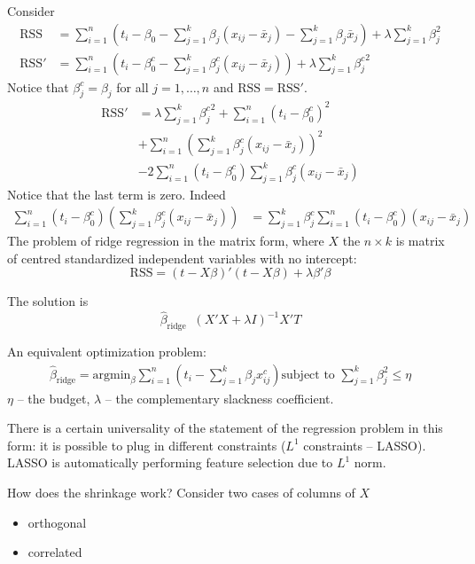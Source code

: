 \documentclass[a4paper]{article}
\newcommand{\brac}[1]{{\left ( #1 \right )}}
\newcommand{\RSS}{\text{RSS}}
\newcommand{\defn}{\mathop{\overset{\Delta}{=}}\nolimits}
\begin{document}
Consider \begin{align*}
	\RSS &= \sum_{i=1}^n \brac{t_i - \beta_0 - \sum_{j=1}^k \beta_j \brac{x_{ij}-\bar{x}_j} - \sum_{j=1}^k \beta_j \bar{x}_j}  + \lambda \sum_{j=1}^k \beta_j^2 \\
	\RSS' &= \sum_{i=1}^n \brac{t_i - \beta_0^c - \sum_{j=1}^k \beta_j^c \brac{x_{ij}-\bar{x}_j}}  + \lambda \sum_{j=1}^k {\beta_j^c}^2
\end{align*}
Notice that $\beta_j^c = \beta_j$ for all $j=1,\ldots,n$ and $\RSS=\RSS'$.
\begin{align*}
	\RSS' &= \lambda \sum_{j=1}^k {\beta_j^c}^2 + \sum_{i=1}^n \brac{t_i - \beta_0^c}^2 \\
	& + \sum_{i=1}^n \brac{\sum_{j=1}^k \beta_j^c \brac{x_{ij}-\bar{x}_j}}^2 \\
	& - 2 \sum_{i=1}^n \brac{t_i - \beta_0^c} \sum_{j=1}^k \beta_j^c \brac{x_{ij}-\bar{x}_j}
\end{align*}
Notice that the last term is zero. Indeed \begin{align*}
	\sum_{i=1}^n \brac{t_i - \beta_0^c} \brac{\sum_{j=1}^k \beta_j^c \brac{x_{ij}-\bar{x}_j}}
	& = \sum_{j=1}^k \beta_j^c \sum_{i=1}^n \brac{t_i - \beta_0^c} \brac{x_{ij}-\bar{x}_j}
\end{align*}
The problem of ridge regression in the matrix form, where $X$ the $n\times k$
is matrix of centred standardized independent variables with no intercept:
\[\RSS = (t-X\beta)'(t-X\beta) + \lambda \beta'\beta\]

The solution is
\[\hat{\beta}_{\text{ridge}}\defn \brac{X'X + \lambda I}^{-1} X'T\]

An equivalent optimization problem:
\begin{align*}
	\hat{\beta}_{\text{ridge}} = \text{argmin}_{\beta} \sum_{i=1}^n \brac{t_i - \sum_{j=1}^k \beta_j x_{ij}^c}
	\text{subject to } \sum_{j=1}^k \beta_j^2 \leq \eta
\end{align*}
$\eta$ -- the budget, $\lambda$ -- the complementary slackness coefficient.

There is a certain universality of the statement of the regression problem in this form:
it is possible to plug in different constraints ($L^1$ constraints -- LASSO).
LASSO is automatically performing feature selection due to $L^1$ norm.


How does the shrinkage work?
Consider two cases of columns of $X$ \begin{itemize}
	\item orthogonal
	\item correlated
\end{itemize}
\end{document}
